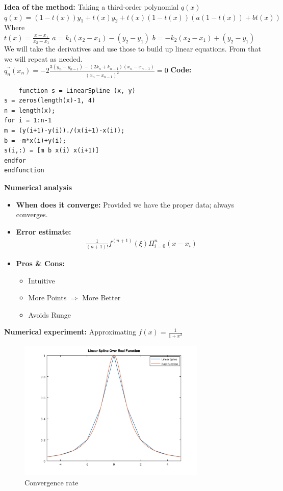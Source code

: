 \documentclass{article}
\begin{document}
{\bf Idea of the method:} 
Taking a third-order polynomial $ q(x) $\\
$q ( x ) = ( 1 - t ( x ) ) y _ { 1 } + t ( x ) y _ { 2 } + t ( x ) ( 1 - t ( x ) ) ( a ( 1 - t ( x ) ) + b t ( x ) )$\\
Where\\
$t ( x ) = \frac { x - x _ { 1 } } { x _ { 2 } - x _ { 1 } }$
$a = k _ { 1 } \left( x _ { 2 } - x _ { 1 } \right) - \left( y _ { 2 } - y _ { 1 } \right)$
$b = - k _ { 2 } \left( x _ { 2 } - x _ { 1 } \right) + \left( y _ { 2 } - y _ { 1 } \right)$
We will take the derivatives and use those to build up linear equations. From that we will repeat as needed.\\
$q _ { n } ^ { \prime \prime } \left( x _ { n } \right) = - 2 \frac { 3 \left( y _ { n } - y _ { n - 1 } \right) - \left( 2 k _ { n } + k _ { n - 1 } \right) \left( x _ { n } - x _ { n - 1 } \right) } { \left( x _ { n } - x _ { n - 1 } \right) ^ { 2 } } = 0$
{\bf Code:}
\begin{verbatim}
    function s = LinearSpline (x, y)
s = zeros(length(x)-1, 4)
n = length(x);
for i = 1:n-1
m = (y(i+1)-y(i))./(x(i+1)-x(i));
b = -m*x(i)+y(i);
s(i,:) = [m b x(i) x(i+1)]
endfor
endfunction
\end{verbatim}
{\bf Numerical analysis}
\begin{itemize}
	\item{\bf When does it converge:} Provided we have the proper data; always converges.
	\item {\bf Error estimate:}
	\begin{equation}
	\begin{split}
	& \frac{1}{(n+1)!}f^{(n+1)}(\xi)\Pi^n_{i=0}(x-x_i)
	\end{split}
	\end{equation}
	\item {\bf Pros \& Cons:}
	\begin{itemize}
		\item Intuitive
		\item More Points $ \Rightarrow $ More Better
		\item Avoids Runge
	\end{itemize}
\end{itemize}
{\bf Numerical experiment:}
Approximating $ f(x)=\frac{1}{1+x^2}$
\begin{figure}[H]
	\caption{Convergence rate}
	\includegraphics[width=0.8\textwidth, height=0.6\textwidth]{LinearSplinePlot.png}
\end{figure}
\end{document}
